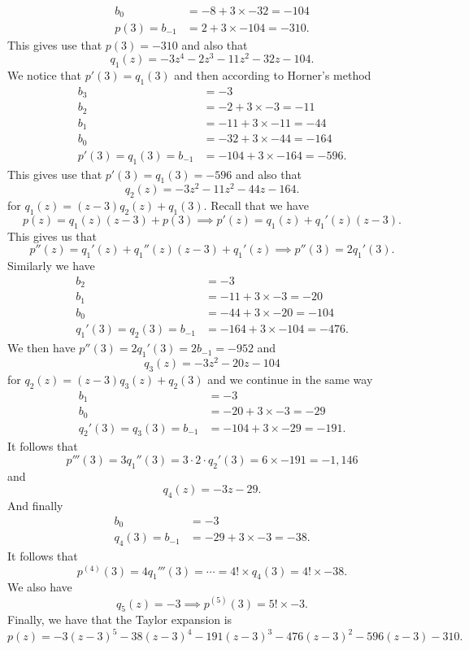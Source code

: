 \documentclass[11pt, a4paper]{article}
\begin{document}
\begin{solution}
\begin{enumerate}
\begin{align*}
    b_0 &= -8 + 3 \times -32 = -104\\
    p(3) = b_{-1} &= 2 + 3 \times -104 = -310.
  \end{align*}
  This gives use that $p(3) = -310$ and also that
  \[
    q_1(z) = -3 z^4 - 2 z^3 - 11 z^2 - 32 z - 104.
  \]
  We notice that $p'(3) = q_1(3)$ and then according to Horner's method
  \begin{align*}
    b_3 &= -3 \\
    b_2 &= -2 + 3 \times -3 = -11 \\
    b_1 &= -11 + 3 \times -11 = -44 \\
    b_0 &= -32 + 3 \times -44 = -164\\
    p'(3) = q_1(3) = b_{-1} &= -104 + 3 \times -164 = -596.
  \end{align*}
  This gives use that $p'(3) = q_1(3) = -596$ and also that
  \[
    q_2(z) = -3 z^2 - 11 z^2 - 44 z - 164.
  \]
  for $q_1(z) = (z - 3) q_2(z) + q_1(3)$.
  Recall that we have
  \[
    p(z) = q_1(z) (z - 3) + p(3) \implies
    p'(z) = q_1(z) + q_1'(z) (z - 3).
  \]
  This gives us that
  \[
    p''(z) = q_1'(z) + q_1''(z) (z - 3) + q_1'(z) \implies
    p''(3) = 2 q_1'(3).
  \]
  Similarly we have
  \begin{align*}
    b_2 &= -3 \\
    b_1 &= -11 + 3 \times -3 = -20 \\
    b_0 &= -44 + 3 \times -20 = -104 \\
    q_1'(3) = q_2(3) = b_{-1} &= -164 + 3 \times -104 = -476.
  \end{align*}
  We then have $p''(3) = 2 q_1'(3) = 2 b_{-1} = -952$ and
  \[
    q_3(z) = -3 z^2 - 20 z - 104
  \]
  for $q_2(z) = (z - 3) q_3(z) + q_2(3)$ and we continue in the same way
  \begin{align*}
    b_1 &= -3 \\
    b_0 &= -20 + 3 \times -3 = -29 \\
    q_2'(3) = q_3(3) = b_{-1} &= -104 + 3 \times -29 = -191.
  \end{align*}
  It follows that
  \[
    p'''(3) = 3 q_1''(3) = 3 \cdot 2 \cdot q_2'(3) = 6 \times -191 = -1,\!146
  \]
  and
  \[
    q_4(z) = -3z - 29.
  \]
  And finally
  \begin{align*}
    b_0 &= -3 \\
    q_4(3) = b_{-1} &= -29 + 3 \times -3 = -38.
  \end{align*}
  It follows that
  \[
    p^{(4)}(3) = 4 q_1'''(3) = \cdots = 4! \times q_4(3) = 4! \times -38.
  \]
  We also have
  \[
    q_5(z) = -3 \implies p^{(5)}(3) = 5 ! \times -3.
  \]
  Finally, we have that the Taylor expansion is
  \[
    p(z) = -3 (z - 3)^5 - 38 (z - 3)^4 - 191 (z - 3)^3 - 476 (z - 3)^2
    - 596 (z - 3) - 310.
  \]
\end{enumerate}
\end{solution}
\end{document}
